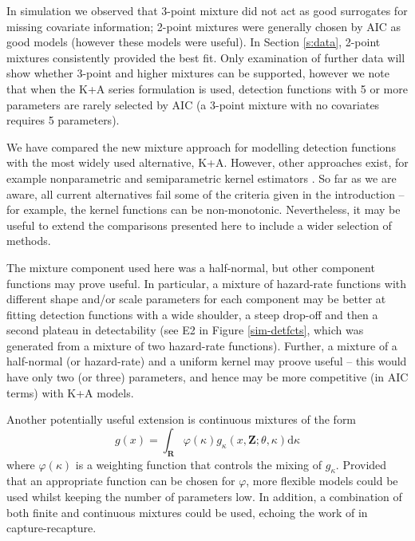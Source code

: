 \documentclass[authoryear,preprint,review,12pt]{elsarticle}
\begin{document}
In simulation we observed that 3-point mixture did not act as good surrogates for missing covariate information; 2-point mixtures were generally chosen by AIC as good models (however these models were useful). In Section \ref{s:data}, 2-point mixtures consistently provided the best fit. Only examination of further data will show whether 3-point and higher mixtures can be supported, however we note that when the K+A series formulation is used, detection functions with 5 or more parameters are rarely selected by AIC (a 3-point mixture with no covariates requires 5 parameters).

We have compared the new mixture approach for modelling detection functions with the most widely used alternative, K+A.  However, other approaches exist, for example nonparametric and semiparametric kernel estimators \citep[see][and references therein]{Eidous:2011}.  So far as we are aware, all current alternatives fail some of the criteria given in the introduction -- for example, the kernel functions can be non-monotonic.  Nevertheless, it may be useful to extend the comparisons presented here to include a wider selection of methods.

The mixture component used here was a half-normal, but other component functions may prove useful.  In particular, a mixture of hazard-rate functions with different shape and/or scale parameters for each component may be better at fitting detection functions with a wide shoulder, a steep drop-off and then a second plateau in detectability (see E2 in Figure \ref{sim-detfcts}, which was generated from a mixture of two hazard-rate functions).  Further, a mixture of a half-normal (or hazard-rate) and a uniform kernel may proove useful -- this would have only two (or three) parameters, and hence may be more competitive (in AIC terms) with K+A models.

Another potentially useful extension is continuous mixtures of the form
\begin{equation*}
g(x) = \int_\mathbf{R} \varphi(\kappa) g_\kappa(x,\mathbf{Z}; \theta, \kappa) \text{d}\kappa
\end{equation*}
where $\varphi(\kappa)$ is a weighting function that controls the mixing of $g_\kappa$. Provided that an appropriate function can be chosen for $\varphi$, more flexible models could be used whilst keeping the number of parameters low. In addition, a combination of both finite and continuous mixtures could be used, echoing the work of \cite{Morgan:2008wy} in capture-recapture.
\end{document}
